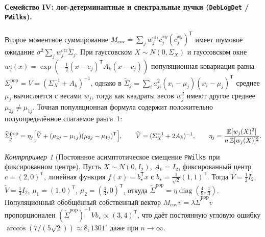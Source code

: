 \documentclass[11pt,a4paper]{article}
\numberwithin{equation}{section}
\theoremstyle{definition}
\theoremstyle{remark}
\newtheorem{example}[theorem]{Контрпример}
\newcommand{\E}{\mathbb{E}}
\newcommand{\diag}{\operatorname{diag}}
\newcommand{\T}{^{\mathsf T}}
\begin{document}
\paragraph{Семейство IV: лог-детерминантные и спектральные пучки (\texttt{DebLogDet} / \texttt{PWilks}).}
Второе моментное суммирование $M_{\mathrm{cov}} = \sum_j w_j^{\mathrm{ctr}} c_j^{xy} (c_j^{xy})\T$
имеет шумовое ожидание $\sigma^2 \sum_j w_j^{\mathrm{ctr}} \widetilde{\Sigma}_j$.
При гауссовском $X \sim N(0, \Sigma_X)$ и гауссовском окне $w_j(x) = \exp(-\frac{1}{2}(x-c_j)\T A_k (x-c_j))$
популяционная ковариация равна $\Sigma_j^{\mathrm{pop}} = V = (\Sigma_X^{-1} + A_k)^{-1}$, однако
в $\widetilde{\Sigma}_j = \sum_i a_{ji}^2 (x_i - \mu_j)(x_i - \mu_j)\T$ среднее $\mu_j$
вычисляется с весами $w_j$, тогда как квадраты весов $w_j^2$ имеют другое среднее $\mu_{2j} \ne \mu_{1j}$.
Точная популяционная формула содержит положительно полуопределённое слагаемое ранга~1:
\begin{equation}\label{eq:stilde-exact}
  \widetilde{\Sigma}_j^{\mathrm{pop}}
  = \eta_j \Bigl[\widetilde{V} + (\mu_{2j} - \mu_{1j})(\mu_{2j} - \mu_{1j})\T\Bigr], \qquad
  \widetilde{V} = (\Sigma_X^{-1} + 2 A_k)^{-1}, \qquad
  \eta_j = \frac{\E[w_j(X)^2]}{n\,\E[w_j(X)]^2}.
\end{equation}

\begin{example}[Постоянное асимптотическое смещение \texttt{PWilks} при фиксированном центре]
\label{ex:pwilks-bias}
Пусть $X \sim N(0, I_2)$, $A_k = I_2$, фиксированный центр $c = (2, 0)\T$, линейная функция
$f(x) = b_\star\T x$ с $b_\star = \frac{1}{\sqrt{2}}(1, 1)\T$. Тогда $V = \frac{1}{2} I_2$,
$\widetilde{V} = \frac{1}{3} I_2$, $\mu_1 = (1, 0)\T$, $\mu_2 = (\frac{4}{3}, 0)\T$, откуда
$\widetilde{\Sigma}^{\mathrm{pop}} = \eta \diag(\frac{4}{9}, \frac{1}{3})$.
Популяционный обобщённый собственный вектор $M_{\mathrm{cov}} v = \lambda \widetilde{\Sigma}^{\mathrm{pop}} v$
пропорционален $(\widetilde{\Sigma}^{\mathrm{pop}})^{-1} V b_\star \propto (3, 4)\T$,
что даёт постоянную угловую ошибку $\arccos(7 / (5\sqrt{2})) \approx 8{,}1301^\circ$ даже при $n \to \infty$.
\end{example}
\end{document}
